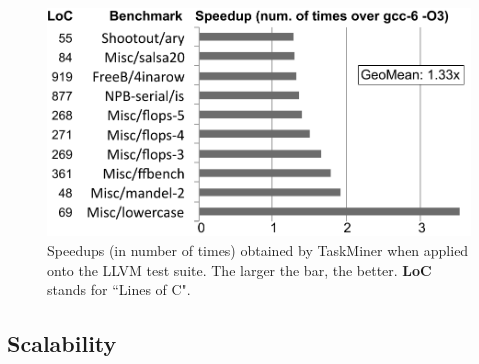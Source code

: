 \documentclass[sigplan,10pt,screen]{acmart}
\newcommand\Taskminer{\mbox{\textsf{TaskMiner}}}
\begin{document}
\begin{figure}[t!]
\begin{center}
\includegraphics[width=1\columnwidth]{images/TM_GeneralProgs}
\caption{Speedups (in number of times) obtained by \Taskminer{} when applied onto
the LLVM test suite.
The larger the bar, the better.
\textbf{LoC} stands for ``Lines of C".}
\label{fig:TM_GeneralProgs}
\end{center}
\end{figure}



\subsection{Scalability}
\label{sub:scalability}
\end{document}
